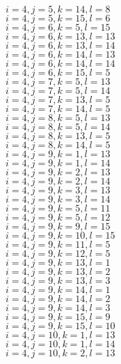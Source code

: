 \documentclass[14pt]{article}
\begin{document}
    $i=4,j=5,k=14,l=8 $ \\ 
    $i=4,j=5,k=15,l=6 $ \\ 
    $i=4,j=6,k=5,l=15 $ \\ 
    $i=4,j=6,k=13,l=13 $ \\ 
    $i=4,j=6,k=13,l=14 $ \\ 
    $i=4,j=6,k=14,l=13 $ \\ 
    $i=4,j=6,k=14,l=14 $ \\ 
    $i=4,j=6,k=15,l=5 $ \\ 
    $i=4,j=7,k=5,l=13 $ \\ 
    $i=4,j=7,k=5,l=14 $ \\ 
    $i=4,j=7,k=13,l=5 $ \\ 
    $i=4,j=7,k=14,l=5 $ \\ 
    $i=4,j=8,k=5,l=13 $ \\ 
    $i=4,j=8,k=5,l=14 $ \\ 
    $i=4,j=8,k=13,l=5 $ \\ 
    $i=4,j=8,k=14,l=5 $ \\ 
    $i=4,j=9,k=1,l=13 $ \\ 
    $i=4,j=9,k=1,l=14 $ \\ 
    $i=4,j=9,k=2,l=13 $ \\ 
    $i=4,j=9,k=2,l=14 $ \\ 
    $i=4,j=9,k=3,l=13 $ \\ 
    $i=4,j=9,k=3,l=14 $ \\ 
    $i=4,j=9,k=5,l=11 $ \\ 
    $i=4,j=9,k=5,l=12 $ \\ 
    $i=4,j=9,k=9,l=15 $ \\ 
    $i=4,j=9,k=10,l=15 $ \\ 
    $i=4,j=9,k=11,l=5 $ \\ 
    $i=4,j=9,k=12,l=5 $ \\ 
    $i=4,j=9,k=13,l=1 $ \\ 
    $i=4,j=9,k=13,l=2 $ \\ 
    $i=4,j=9,k=13,l=3 $ \\ 
    $i=4,j=9,k=14,l=1 $ \\ 
    $i=4,j=9,k=14,l=2 $ \\ 
    $i=4,j=9,k=14,l=3 $ \\ 
    $i=4,j=9,k=15,l=9 $ \\ 
    $i=4,j=9,k=15,l=10 $ \\ 
    $i=4,j=10,k=1,l=13 $ \\ 
    $i=4,j=10,k=1,l=14 $ \\ 
    $i=4,j=10,k=2,l=13 $ \\ 
\end{document}

